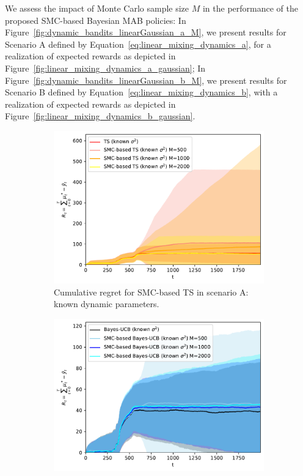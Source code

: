 
We assess the impact of Monte Carlo sample size $M$ in the performance of the proposed SMC-based Bayesian MAB policies:
In Figure~\ref{fig:dynamic_bandits_linearGaussian_a_M}, we present results for Scenario A defined by Equation~\eqref{eq:linear_mixing_dynamics_a},
for a realization of expected rewards as depicted in Figure~\ref{fig:linear_mixing_dynamics_a_gaussian};
In Figure~\ref{fig:dynamic_bandits_linearGaussian_b_M}, we  present results for Scenario B defined by Equation~\eqref{eq:linear_mixing_dynamics_b}, 
with a realization of expected rewards as depicted in Figure~\ref{fig:linear_mixing_dynamics_b_gaussian}.

\begin{figure}[!h]
	\centering
	\begin{subfigure}[b]{0.45\textwidth}
		\includegraphics[width=\textwidth]{./fods_figs/dynamic/linearGaussian/a_selectedM_cumulative_regret_dknown_ts_knownsigma}
		\caption{Cumulative regret for SMC-based TS in scenario A: known dynamic parameters.}
		\label{fig:dynamic_bandits_linearGaussian_a_ts_dknown_knownsigma_M}
	\end{subfigure}\qquad
	\begin{subfigure}[b]{0.45\textwidth}
		\includegraphics[width=\textwidth]{./fods_figs/dynamic/linearGaussian/a_selectedM_cumulative_regret_dknown_bucb_knownsigma}

\end{subfigure}
\end{figure}
